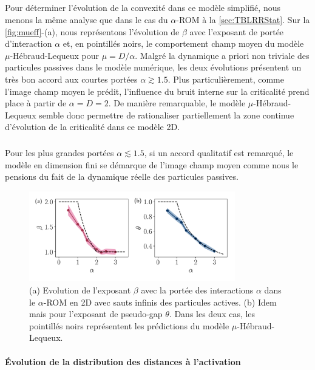 \subparagraph{}Pour déterminer l'évolution de la convexité dans ce modèle simplifié, nous menons la même analyse que dans le cas du $\alpha$-ROM à la \autoref{sec:TBLRRStat}. Sur la \autoref{fig:mueff}-(a), nous représentons l'évolution de $\beta$ avec l'exposant de portée d'interaction $\alpha$ et, en pointillés noirs, le comportement champ moyen du modèle $\mu$-Hébraud-Lequeux pour $\mu = D/\alpha$. Malgré la dynamique a priori non triviale des particules passives dans le modèle numérique, les deux évolutions présentent un très bon accord aux courtes portées $\alpha \gtrsim 1.5$. Plus particulièrement, comme l'image champ moyen le prédit, l'influence du bruit interne sur la criticalité prend place à partir de $\alpha = D = 2$. De manière remarquable, le modèle $\mu$-Hébraud-Lequeux semble donc permettre de rationaliser partiellement la zone continue d'évolution de la criticalité dans ce modèle 2D.

\subparagraph{}Pour les plus grandes portées $\alpha\lesssim 1.5$, si un accord qualitatif est remarqué, le modèle en dimension fini se démarque de l'image champ moyen comme nous le pensions du fait de la dynamique réelle des particules passives.

\begin{figure}[h]
	\centering
	\includegraphics[width=0.8\textwidth]{Chapitre3/Figures/Interpretation/beta_alphaMF.pdf}
	\caption{(a) Evolution de l'exposant $\beta$ avec la portée des interactions $\alpha$ dans le $\alpha$-ROM en 2D avec sauts infinis des particules actives. (b) Idem mais pour l'exposant de pseudo-gap $\theta$. Dans les deux cas, les pointillés noirs représentent les prédictions du modèle $\mu$-Hébraud-Lequeux.}
	\label{fig:mueff}
\end{figure}

\paragraph{Évolution de la distribution des distances à l'activation}

